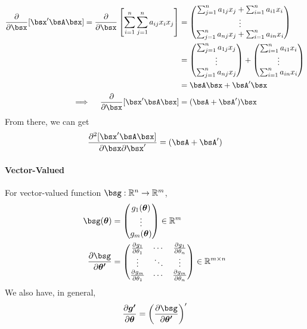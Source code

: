\documentclass[12pt]{article}
\theoremstyle{plain}
\theoremstyle{definition}
\theoremstyle{remark}
\newcommand{\bstheta}{\boldsymbol{\theta}}
\newcommand{\sumin}{\sum^n_{i=1}}
\newcommand{\sumjn}{\sum^n_{j=1}}
\begin{document}
\begin{align*}
  \frac{\partial}{\partial \bsx}
  [\bsx'\bsA\bsx]
  =
  \frac{\partial}{\partial \bsx}
  \left[
    \sumin
    \sumjn
    a_{ij} x_i x_j
  \right]
  &=
  \begin{pmatrix}
    \sumjn a_{1j} x_j
    + \sumin a_{i1} x_i \\
    \vdots \\
    \sumjn a_{nj} x_j
    + \sumin a_{in} x_i \\
  \end{pmatrix}\\
  &=
  \begin{pmatrix}
    \sumjn a_{1j} x_j \\
    \vdots \\
    \sumjn a_{nj} x_j
  \end{pmatrix}
  +
  \begin{pmatrix}
    \sumin a_{i1} x_i \\
    \vdots \\
    \sumin a_{in} x_i \\
  \end{pmatrix}\\
  &= \bsA\bsx + \bsA'\bsx\\
  \implies\quad
  \frac{\partial}{\partial \bsx}
  [\bsx'\bsA\bsx]
  &= (\bsA+\bsA')\bsx
\end{align*}
From there, we can get
\begin{align*}
  \frac{\partial^2[\bsx'\bsA\bsx]}{\partial \bsx \partial \bsx'}
  =
  (\bsA + \bsA')
\end{align*}


\paragraph{Vector-Valued}

For vector-valued function $\bsg:
\mathbb{R}^n\rightarrow\mathbb{R}^m$,
\begin{align*}
  \bsg(\bstheta)
  &=
  \begin{pmatrix}
    g_1(\bstheta) \\
    \vdots \\
    g_m(\bstheta) \\
  \end{pmatrix}\in \mathbb{R}^m\\
  \frac{\partial \bsg}{\partial \boldsymbol{\theta'}}
  &=
  \begin{pmatrix}
    \frac{\partial g_1}{\partial \theta_1}
      & \cdots & \frac{\partial g_1}{\partial \theta_n}\\
    \vdots & \ddots & \vdots\\
    \frac{\partial g_m}{\partial \theta_1}
      & \cdots & \frac{\partial g_m}{\partial \theta_n}\\
  \end{pmatrix}
  \in \mathbb{R}^{m\times n}
\end{align*}
We also have, in general,
\begin{align*}
  \frac{\partial\boldsymbol{g'}}{\partial \bstheta}
  =
  \left(
  \frac{\partial\bsg}{\partial \boldsymbol{\theta'}}
  \right)'
\end{align*}
\end{document}
